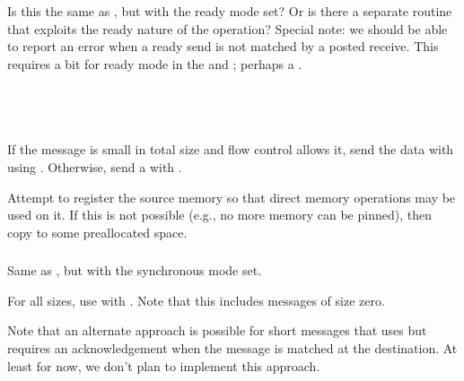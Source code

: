 \documentclass{article}
\begin{document}
\subsubsection{}
Is this the same as , but with the ready mode set?  Or is
there a separate routine that exploits the ready nature of the operation?
Special note: we should be able to report an error when a ready send is not
matched by a posted receive.  This requires a bit for ready mode in the
 and ; perhaps a
. 

\subsubsection{}
\begin{adi3}
\begin{mmadi}
\\
\\
\begin{core}
If the message is small in total size and flow control allows it, send
the data with  using .
Otherwise, send a  with
.  
\end{core}
\begin{via}
Attempt to register the source memory so that direct memory operations may be
used on it.  If this is not possible (e.g., no more memory can be pinned),
then copy to some preallocated space.
\end{via}
\end{mmadi}
\end{adi3}

\subsubsection{}
Same as , but with the synchronous mode set.  

\begin{core}
For all sizes, use  with
.  Note that this includes messages of size zero.
\end{core}
Note that an alternate approach is possible for short messages that uses
 but requires an acknowledgement when the message is
matched at the destination.  At least for now, we don't plan to implement this
approach. 
\end{document}
